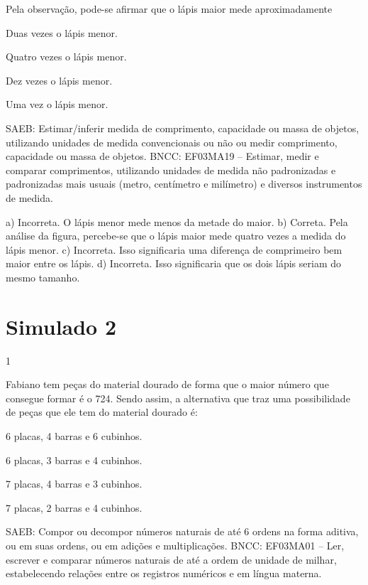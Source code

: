 {\begin{escolha}
{Pela observação, pode-se afirmar que o lápis maior mede aproximadamente

\begin{escolha}
\item
  Duas vezes o lápis menor.
\item
  Quatro vezes o lápis menor.
\item
  Dez vezes o lápis menor.
\item
  Uma vez o lápis menor.
\end{escolha}

SAEB: Estimar/inferir medida de comprimento, capacidade ou
massa de objetos, utilizando unidades de medida convencionais ou não ou
medir comprimento, capacidade ou massa de objetos.
BNCC: EF03MA19 -- Estimar, medir e comparar comprimentos, utilizando unidades de medida
não padronizadas e padronizadas mais usuais (metro, centímetro e milímetro) e diversos
instrumentos de medida.

a) Incorreta. O lápis menor mede menos da metade do maior.
b) Correta. Pela análise da figura, percebe-se que o lápis maior mede quatro vezes a medida do lápis menor.
c) Incorreta. Isso significaria uma diferença de comprimeiro bem maior entre os lápis.
d) Incorreta. Isso significaria que os dois lápis seriam do mesmo tamanho.

\chapter{Simulado 2}

\num{1}

Fabiano tem peças do material dourado de forma que o maior número
que consegue formar é o 724. Sendo assim, a alternativa que traz uma
possibilidade de peças que ele tem do material dourado é:

\begin{escolha}
\item
  6 placas, 4 barras e 6 cubinhos.
\item
  6 placas, 3 barras e 4 cubinhos.
\item
  7 placas, 4 barras e 3 cubinhos.
\item
  7 placas, 2 barras e 4 cubinhos.
\end{escolha}

SAEB: Compor ou decompor números naturais de até 6 ordens na forma aditiva, ou em suas ordens, ou em adições e multiplicações.
BNCC: EF03MA01 -- Ler, escrever e comparar números naturais de até a ordem de unidade de milhar, estabelecendo relações entre os registros numéricos e em língua materna.

}
\end{escolha}}

